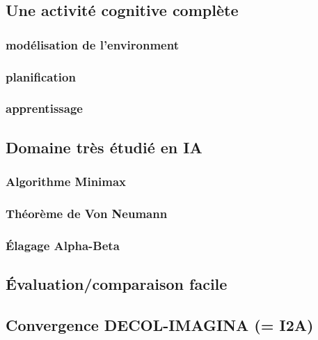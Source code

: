 \subsection{Une activité cognitive complète}
\subsubsection{modélisation de l'environment}
\subsubsection{planification}
\subsubsection{apprentissage}

\subsection{Domaine très étudié en IA}
\subsubsection{Algorithme Minimax}
\subsubsection{Théorème de Von Neumann}
\subsubsection{Élagage Alpha-Beta}

\subsection{Évaluation/comparaison facile}

\subsection{Convergence DECOL-IMAGINA (= I2A) }